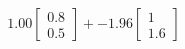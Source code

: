 \documentclass[preview]{standalone}
\begin{document}
\begin{align*}
1.00 \begin{bmatrix} 0.8 \\ 0.5 \end{bmatrix} + -1.96 \begin{bmatrix} 1 \\ 1.6 \end{bmatrix}
\end{align*}
\end{document}
